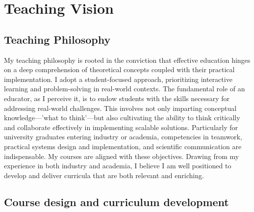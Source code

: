 \documentclass[12pt,a4paper,sans]{moderncv}
\begin{document}
\section*{Teaching Vision}

\subsection*{Teaching Philosophy}

My teaching philosophy is rooted in the conviction that effective education hinges on a deep comprehension of theoretical concepts coupled with their practical implementation. I adopt a student-focused approach, prioritizing interactive learning and problem-solving in real-world contexts. The fundamental role of an educator, as I perceive it, is to endow students with the skills necessary for addressing real-world challenges. This involves not only imparting conceptual knowledge—'what to think'—but also cultivating the ability to think critically and collaborate effectively in implementing scalable solutions. Particularly for university graduates entering industry or academia, competencies in teamwork, practical systems design and implementation, and scientific communication are indispensable. My courses are aligned with these objectives. Drawing from my experience in both industry and academia, I believe I am well positioned to develop and deliver curricula that are both relevant and enriching.

\subsection*{Course design and curriculum development}
\end{document}
